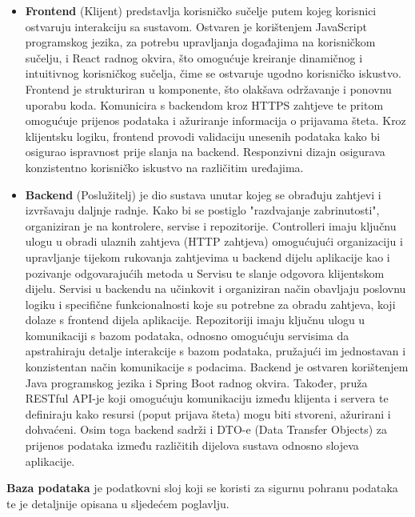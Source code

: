 \begin{itemize}
	\item \textbf{Frontend} (Klijent) predstavlja korisničko sučelje putem kojeg korisnici ostvaruju interakciju sa sustavom. Ostvaren je korištenjem JavaScript programskog jezika, za potrebu upravljanja događajima na korisničkom sučelju, i React radnog okvira, što omogućuje kreiranje dinamičnog i intuitivnog korisničkog sučelja, čime se ostvaruje ugodno korisničko iskustvo. Frontend je strukturiran u komponente, što olakšava održavanje i ponovnu uporabu koda. Komunicira s backendom kroz HTTPS zahtjeve te pritom omogućuje prijenos podataka i ažuriranje informacija o prijavama šteta. Kroz klijentsku logiku, frontend provodi validaciju unesenih podataka kako bi osigurao ispravnost prije slanja na backend. Responzivni dizajn osigurava konzistentno korisničko iskustvo na različitim uređajima.
	\item \textbf{Backend} (Poslužitelj) je dio sustava unutar kojeg se obrađuju zahtjevi i izvršavaju daljnje radnje. Kako bi se postiglo "razdvajanje zabrinutosti", organiziran je na kontrolere, servise i repozitorije. Controlleri imaju ključnu ulogu u obradi ulaznih zahtjeva (HTTP zahtjeva) omogućujući organizaciju i upravljanje tijekom rukovanja zahtjevima u backend dijelu aplikacije kao i pozivanje odgovarajućih metoda u Servisu te slanje odgovora klijentskom dijelu. Servisi u backendu na učinkovit i organiziran način obavljaju poslovnu logiku i specifične funkcionalnosti koje su potrebne za obradu zahtjeva, koji dolaze s frontend dijela aplikacije. Repozitoriji imaju ključnu ulogu u komunikaciji s bazom podataka, odnosno omogućuju servisima da apstrahiraju detalje interakcije s bazom podataka, pružajući im jednostavan i konzistentan način komunikacije s podacima. Backend je ostvaren korištenjem Java programskog jezika i Spring Boot radnog okvira. Također, pruža RESTful API-je koji omogućuju komunikaciju između klijenta i servera te definiraju kako resursi (poput prijava šteta) mogu biti stvoreni, ažurirani i dohvaćeni. Osim toga backend sadrži i DTO-e (Data Transfer Objects) za prijenos podataka između različitih dijelova sustava odnosno slojeva aplikacije.
\end{itemize}

\noindent \textbf{Baza podataka} je podatkovni sloj koji se koristi za sigurnu pohranu podataka te je detaljnije opisana u sljedećem poglavlju.

